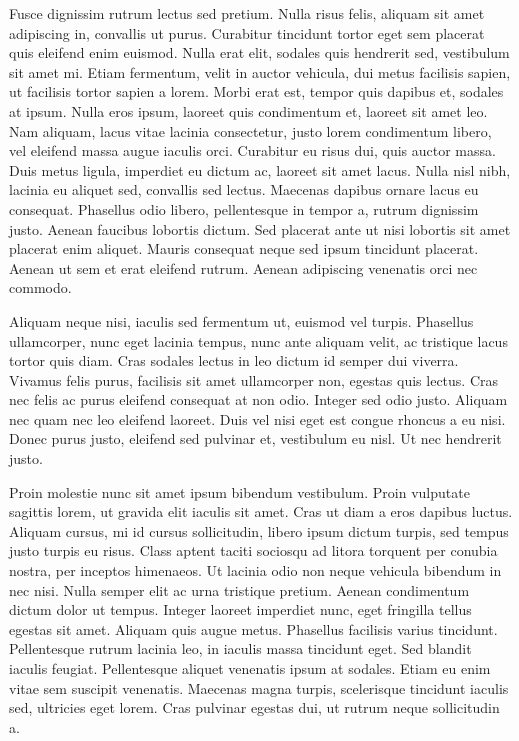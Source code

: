 Fusce dignissim rutrum lectus sed pretium.
Nulla risus felis, aliquam sit amet adipiscing in, convallis ut purus.
Curabitur tincidunt tortor eget sem placerat quis eleifend enim euismod.
Nulla erat elit, sodales quis hendrerit sed, vestibulum sit amet mi.
Etiam fermentum, velit in auctor vehicula, dui metus facilisis sapien, ut facilisis tortor sapien a lorem.
Morbi erat est, tempor quis dapibus et, sodales at ipsum.
Nulla eros ipsum, laoreet quis condimentum et, laoreet sit amet leo.
Nam aliquam, lacus vitae lacinia consectetur, justo lorem condimentum libero, vel eleifend massa augue iaculis orci.
Curabitur eu risus dui, quis auctor massa.
Duis metus ligula, imperdiet eu dictum ac, laoreet sit amet lacus.
Nulla nisl nibh, lacinia eu aliquet sed, convallis sed lectus.
Maecenas dapibus ornare lacus eu consequat.
Phasellus odio libero, pellentesque in tempor a, rutrum dignissim justo.
Aenean faucibus lobortis dictum.
Sed placerat ante ut nisi lobortis sit amet placerat enim aliquet.
Mauris consequat neque sed ipsum tincidunt placerat.
Aenean ut sem et erat eleifend rutrum.
Aenean adipiscing venenatis orci nec commodo.

Aliquam neque nisi, iaculis sed fermentum ut, euismod vel turpis.
Phasellus ullamcorper, nunc eget lacinia tempus, nunc ante aliquam velit, ac tristique lacus tortor quis diam.
Cras sodales lectus in leo dictum id semper dui viverra.
Vivamus felis purus, facilisis sit amet ullamcorper non, egestas quis lectus.
Cras nec felis ac purus eleifend consequat at non odio.
Integer sed odio justo.
Aliquam nec quam nec leo eleifend laoreet.
Duis vel nisi eget est congue rhoncus a eu nisi.
Donec purus justo, eleifend sed pulvinar et, vestibulum eu nisl.
Ut nec hendrerit justo.

Proin molestie nunc sit amet ipsum bibendum vestibulum.
Proin vulputate sagittis lorem, ut gravida elit iaculis sit amet.
Cras ut diam a eros dapibus luctus.
Aliquam cursus, mi id cursus sollicitudin, libero ipsum dictum turpis, sed tempus justo turpis eu risus.
Class aptent taciti sociosqu ad litora torquent per conubia nostra, per inceptos himenaeos.
Ut lacinia odio non neque vehicula bibendum in nec nisi.
Nulla semper elit ac urna tristique pretium.
Aenean condimentum dictum dolor ut tempus.
Integer laoreet imperdiet nunc, eget fringilla tellus egestas sit amet.
Aliquam quis augue metus.
Phasellus facilisis varius tincidunt.
Pellentesque rutrum lacinia leo, in iaculis massa tincidunt eget.
Sed blandit iaculis feugiat.
Pellentesque aliquet venenatis ipsum at sodales.
Etiam eu enim vitae sem suscipit venenatis.
Maecenas magna turpis, scelerisque tincidunt iaculis sed, ultricies eget lorem.
Cras pulvinar egestas dui, ut rutrum neque sollicitudin a.


